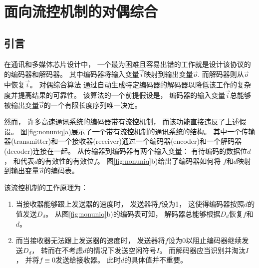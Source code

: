\chapter{面向流控机制的对偶综合}
\label{chap:4}

%
%

\section{ 引言}

在通讯和多媒体芯片设计中，
一个最为困难且容易出错的工作就是设计该协议的的编码器和解码器。
其中编码器将输入变量$\vec{i}$映射到输出变量$\vec{o}$.
而解码器则从$\vec{o}$中恢复$\vec{i}$。
对偶综合算法
通过自动生成特定编码器的解码器以降低该工作的复杂度并提高结果的可靠性。
该算法的一个前提假设是，
编码器的输入变量$\vec{i}$总能够被输出变量$\vec{o}$的一个有限长度序列唯一决定。

然而，
许多高速通讯系统的编码器带有流控机制，
而该功能直接违反了上述假设。
图\ref{fig:nonuniq}a)展示了一个带有流控机制的通讯系统的结构。
其中一个传输器(transmitter)和一个接收器(receiver)通过一个编码器(encoder)和一个解码器(decoder)连接在一起。
从传输器到编码器有两个输入变量：
有待编码的数据位$d$，
和代表$d$的有效性的有效位$f$。
图\ref{fig:nonuniq}b)给出了编码器如何将
$f$和$d$映射到输出变量$\vec{o}$的编码表。

该流控机制的工作原理为：
\begin{enumerate}
\item
当接收器能够跟上发送器的速度时，
发送器将$f$设为1，
这使得编码器按照$d$的值发送$D_d$。
从图\ref{fig:nonuniq}b)的编码表可知，
解码器总能够根据$D_d$恢复$f$和$d$。
\item
而当接收器无法跟上发送器的速度时，
发送器将$f$设为0以阻止编码器继续发送$D_d$，
转而在不考虑$d$的情况下发送空闲符号$I$。
而解码器应当识别并淘汰$I$，
并将$f\equiv 0$发送给接收器。
此时$d$的具体值并不重要。
\end{enumerate}

